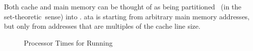 \begin{comment}
   The term cache line is also used to refer to \alts{identically, appropriately} sized
   blocks in main memory.
   These blocks are fixed:

   Cache lines in main memory are fixed.
   Data blocks that are loaded don't start at arbitrary addresses, but at multiples of the
   cache line size.
\end{comment}
Both cache and main memory can be thought of as being partitioned%
\ (in the set-theoretic\ sense) %
into .  ata is   starting from
arbitrary main memory addresses,
but only from addresses that are multiples of the cache line size.



%

\begin{figure}
   \centering
   
   \caption{Processor Times for Running }
   \label{fig:line-size}
\end{figure}

